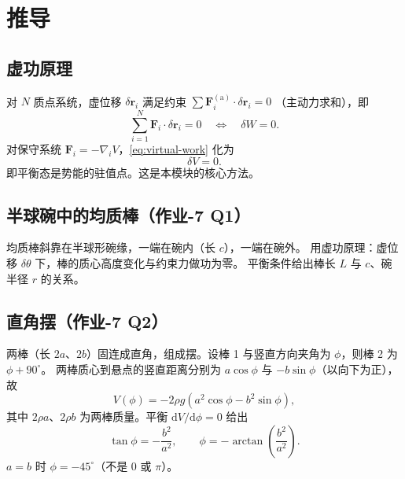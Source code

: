 \documentclass[UTF8,a4paper,11pt]{ctexart}
\begin{document}
\section{推导}
\label{sec:derive}

\subsection{虚功原理}
\label{sub:virtual-work}

对 $N$ 质点系统，虚位移 $\delta\boldsymbol r_i$ 满足约束
$\sum \boldsymbol F_i^{\mathrm{(a)}}\cdot\delta\boldsymbol r_i=0$
（主动力求和），即
\begin{equation}
  \sum_{i=1}^N \boldsymbol F_i\cdot\delta\boldsymbol r_i=0
  \quad\Longleftrightarrow\quad
  \delta W=0.
  \label{eq:virtual-work}
\end{equation}
对保守系统 $\boldsymbol F_i=-\nabla_i V$，\eqref{eq:virtual-work} 化为
\begin{equation}
  \delta V=0.
  \label{eq:stationary-V}
\end{equation}
即平衡态是势能的驻值点。这是本模块的核心方法。

\subsection{半球碗中的均质棒（作业-7 Q1）}
\label{sub:rod-bowl}

均质棒斜靠在半球形碗缘，一端在碗内（长 $c$），一端在碗外。
用虚功原理：虚位移 $\delta\theta$ 下，棒的质心高度变化与约束力做功为零。
平衡条件给出棒长 $L$ 与 $c$、碗半径 $r$ 的关系。

\subsection{直角摆（作业-7 Q2）}
\label{sub:right-angle}

两棒（长 $2a$、$2b$）固连成直角，组成摆。设棒 1 与竖直方向夹角为 $\phi$，则棒 2 为 $\phi+90^\circ$。
两棒质心到悬点的竖直距离分别为 $a\cos\phi$ 与 $-b\sin\phi$（以向下为正），故
\begin{equation}
  V(\phi)=-2\rho g\left(a^2\cos\phi-b^2\sin\phi\right),
\end{equation}
其中 $2\rho a$、$2\rho b$ 为两棒质量。平衡 $\mathrm dV/\mathrm d\phi=0$ 给出
\begin{equation}
  \tan\phi=-\frac{b^2}{a^2},
  \qquad \phi=-\arctan\!\left(\frac{b^2}{a^2}\right).
\end{equation}
$a=b$ 时 $\phi=-45^\circ$（不是 $0$ 或 $\pi$）。
\end{document}
